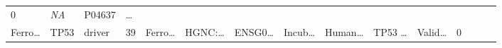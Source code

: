 \documentclass[
]{article}
\begin{document}
\begin{longtable}[]{@{}lllllllllllllll@{}}
\begin{minipage}[t]{0.05\columnwidth}
0\strut
\end{minipage} & \begin{minipage}[t]{0.05\columnwidth}\raggedright
\emph{NA}\strut
\end{minipage} & \begin{minipage}[t]{0.05\columnwidth}\raggedright
P04637\strut
\end{minipage} & \begin{minipage}[t]{0.02\columnwidth}\raggedright
\ldots{}\strut
\end{minipage}\tabularnewline
\begin{minipage}[t]{0.05\columnwidth}\raggedright
Ferro\ldots{}\strut
\end{minipage} & \begin{minipage}[t]{0.05\columnwidth}\raggedright
TP53\strut
\end{minipage} & \begin{minipage}[t]{0.04\columnwidth}\raggedright
driver\strut
\end{minipage} & \begin{minipage}[t]{0.02\columnwidth}\raggedright
39\strut
\end{minipage} & \begin{minipage}[t]{0.05\columnwidth}\raggedright
Ferro\ldots{}\strut
\end{minipage} & \begin{minipage}[t]{0.05\columnwidth}\raggedright
HGNC:\ldots{}\strut
\end{minipage} & \begin{minipage}[t]{0.05\columnwidth}\raggedright
ENSG0\ldots{}\strut
\end{minipage} & \begin{minipage}[t]{0.05\columnwidth}\raggedright
Incub\ldots{}\strut
\end{minipage} & \begin{minipage}[t]{0.05\columnwidth}\raggedright
Human\ldots{}\strut
\end{minipage} & \begin{minipage}[t]{0.05\columnwidth}\raggedright
TP53 \ldots{}\strut
\end{minipage} & \begin{minipage}[t]{0.05\columnwidth}\raggedright
Valid\ldots{}\strut
\end{minipage} & \begin{minipage}[t]{0.05\columnwidth}\raggedright
0\strut
\end{minipage} & \begin{minipage}[t]{0.05\columnwidth}\raggedright

\end{minipage}
\end{longtable}
\end{document}
